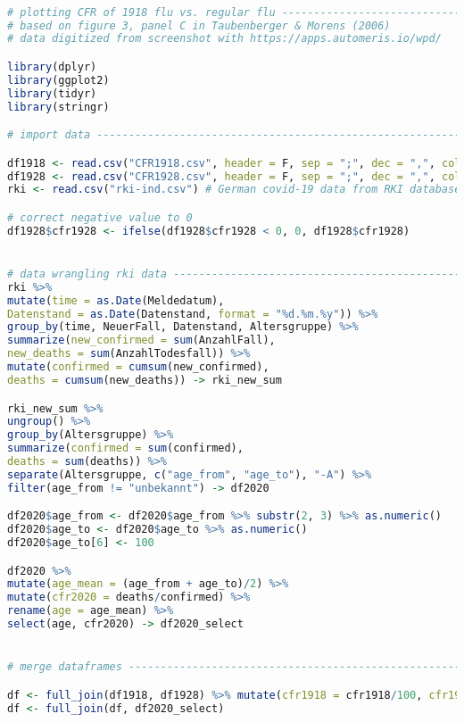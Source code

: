 \begin{lstlisting}[language=R,caption={Data Preparation Figure \ref{fig_cfr}: Case Fatality Rates of Pneumonia and Influenza during the 1918 Flu Pandemic, 1928, and Covid-19 in 2020}, label=lst_cfr]

# plotting CFR of 1918 flu vs. regular flu --------------------------------
# based on figure 3, panel C in Taubenberger & Morens (2006)
# data digitized from screenshot with https://apps.automeris.io/wpd/

library(dplyr)
library(ggplot2)
library(tidyr)
library(stringr)

# import data -------------------------------------------------------------

df1918 <- read.csv("CFR1918.csv", header = F, sep = ";", dec = ",", col.names = c("age", "cfr1918"))
df1928 <- read.csv("CFR1928.csv", header = F, sep = ";", dec = ",", col.names = c("age", "cfr1928"))
rki <- read.csv("rki-ind.csv") # German covid-19 data from RKI database

# correct negative value to 0              
df1928$cfr1928 <- ifelse(df1928$cfr1928 < 0, 0, df1928$cfr1928)


# data wrangling rki data -------------------------------------------------
rki %>% 
mutate(time = as.Date(Meldedatum),
Datenstand = as.Date(Datenstand, format = "%d.%m.%y")) %>% 
group_by(time, NeuerFall, Datenstand, Altersgruppe) %>% 
summarize(new_confirmed = sum(AnzahlFall),
new_deaths = sum(AnzahlTodesfall)) %>%
mutate(confirmed = cumsum(new_confirmed),
deaths = cumsum(new_deaths)) -> rki_new_sum

rki_new_sum %>% 
ungroup() %>% 
group_by(Altersgruppe) %>% 
summarize(confirmed = sum(confirmed),
deaths = sum(deaths)) %>% 
separate(Altersgruppe, c("age_from", "age_to"), "-A") %>% 
filter(age_from != "unbekannt") -> df2020

df2020$age_from <- df2020$age_from %>% substr(2, 3) %>% as.numeric()
df2020$age_to <- df2020$age_to %>% as.numeric()
df2020$age_to[6] <- 100

df2020 %>% 
mutate(age_mean = (age_from + age_to)/2) %>% 
mutate(cfr2020 = deaths/confirmed) %>% 
rename(age = age_mean) %>% 
select(age, cfr2020) -> df2020_select


# merge dataframes --------------------------------------------------------

df <- full_join(df1918, df1928) %>% mutate(cfr1918 = cfr1918/100, cfr1928 = cfr1928/100) 
df <- full_join(df, df2020_select)
\end{lstlisting}